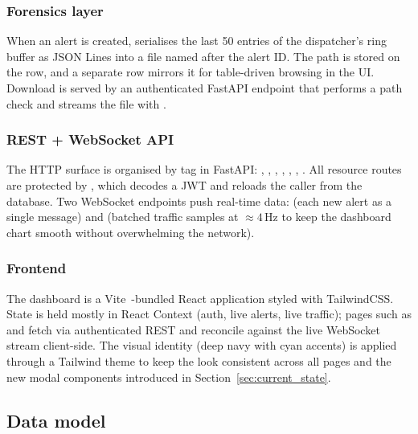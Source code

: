 \subsubsection{Forensics layer}

When an alert is created,  serialises the
last 50 entries of the dispatcher's ring buffer as JSON Lines into a
file named after the alert ID. The path is stored on the 
row, and a separate  row mirrors it for table-driven
browsing in the UI. Download is served by an authenticated FastAPI
endpoint that performs a path check and streams the file with
.

\subsubsection{REST + WebSocket API}

The HTTP surface is organised by tag in FastAPI:
, , ,
, , ,
. All resource routes are protected by
, which decodes a JWT and reloads the
caller from the database. Two WebSocket endpoints push real-time data:
 (each new alert as a single message) and
 (batched traffic samples at $\approx 4$\,Hz to keep
the dashboard chart smooth without overwhelming the network).

\subsubsection{Frontend}

The dashboard is a Vite~\cite{vite}-bundled React application styled
with TailwindCSS. State is held mostly in React Context (auth,
live alerts, live traffic); pages such as  and 
fetch via authenticated REST and reconcile against the live WebSocket
stream client-side. The visual identity (deep navy with cyan accents) is
applied through a Tailwind theme to keep the look consistent across all
pages and the new modal components introduced in Section~\ref{sec:current_state}.

\subsection{Data model}


